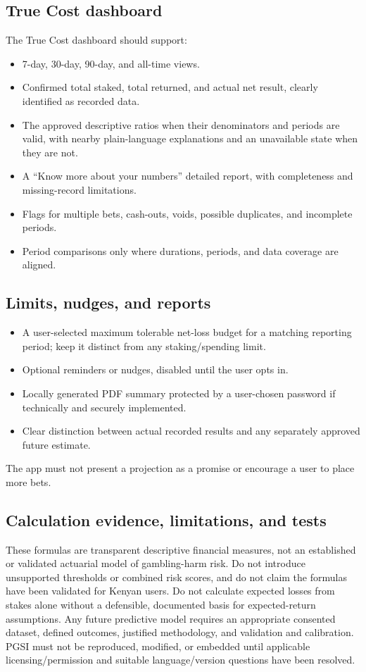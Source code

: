 \documentclass[11pt,a4paper]{article}
\begin{document}
\subsection{True Cost dashboard}
The True Cost dashboard should support:
\begin{itemize}
  \item 7-day, 30-day, 90-day, and all-time views.
  \item Confirmed total staked, total returned, and actual net result, clearly identified as recorded data.
  \item The approved descriptive ratios when their denominators and periods are valid, with nearby plain-language explanations and an unavailable state when they are not.
  \item A ``Know more about your numbers'' detailed report, with completeness and missing-record limitations.
  \item Flags for multiple bets, cash-outs, voids, possible duplicates, and incomplete periods.
  \item Period comparisons only where durations, periods, and data coverage are aligned.
\end{itemize}

\subsection{Limits, nudges, and reports}
\begin{itemize}
  \item A user-selected maximum tolerable net-loss budget for a matching reporting period; keep it distinct from any staking/spending limit.
  \item Optional reminders or nudges, disabled until the user opts in.
  \item Locally generated PDF summary protected by a user-chosen password if technically and securely implemented.
  \item Clear distinction between actual recorded results and any separately approved future estimate.
\end{itemize}
The app must not present a projection as a promise or encourage a user to place more bets.

\subsection{Calculation evidence, limitations, and tests}
These formulas are transparent descriptive financial measures, not an established or validated actuarial model of gambling-harm risk. Do not introduce unsupported thresholds or combined risk scores, and do not claim the formulas have been validated for Kenyan users. Do not calculate expected losses from stakes alone without a defensible, documented basis for expected-return assumptions. Any future predictive model requires an appropriate consented dataset, defined outcomes, justified methodology, and validation and calibration. PGSI must not be reproduced, modified, or embedded until applicable licensing/permission and suitable language/version questions have been resolved.
\end{document}
